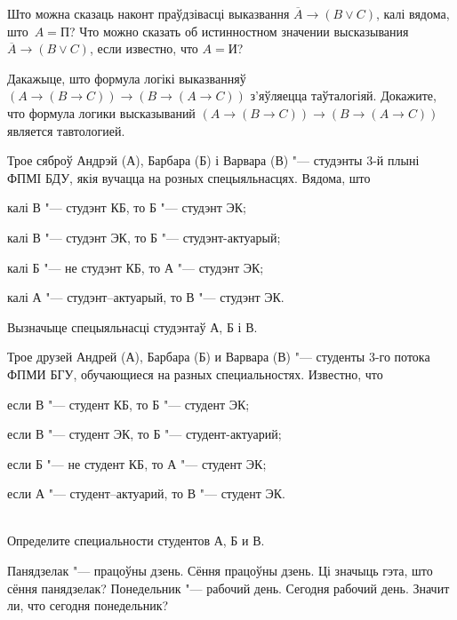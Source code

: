 \begin{problemList}

\problemItemSimple
{Што можна сказаць наконт праўдзівасці выказвання $\overline{A} \to (B \vee C)$, калі вядома, што~$A = \mbox{П}$?}
{Что можно сказать об истинностном значении высказывания $\overline{A} \to (B \vee C)$, если известно, что $A = \mbox{И}$?}

\bigskip

\problemItemSimple
{Дакажыце, што формула логікі выказванняў $(A \to (B \to C)) \to (B \to (A \to C))$ з'яўляецца таўталогіяй.}
{Докажите, что формула логики высказываний $(A \to (B \to C)) \to (B \to (A \to C))$ является тавтологией.}

\bigskip

\problemItemSimple
{Трое сяброў Андрэй (А), Барбара (Б) і Варвара (В) "--- студэнты 3-й плыні ФПМІ БДУ, якія вучацца на розных спецыяльнасцях.
Вядома, што
\begin{belarusianEnumerate}
    \item калі В "--- студэнт КБ, то Б "--- студэнт ЭК;
    \item калі В "--- студэнт ЭК, то Б "--- студэнт-актуарый;
    \item калі Б "--- не студэнт КБ, то А "--- студэнт ЭК;
    \item калі А "--- студэнт–актуарый, то В "--- студэнт ЭК.
\end{belarusianEnumerate}

\vspace{-8pt}
Вызначыце спецыяльнасці студэнтаў А, Б і В.}
{Трое друзей Андрей (А), Барбара (Б) и Варвара (В) "--- студенты 3-го потока ФПМИ БГУ, обучающиеся на разных специальностях.
Известно, что
\begin{russianEnumerate}
    \item если В "--- студент КБ, то Б "--- студент ЭК;
    \item если В "--- студент ЭК, то Б "--- студент-актуарий;
    \item если Б "--- не студент КБ, то А "--- студент ЭК;
    \item если А "--- студент–актуарий, то В "--- студент ЭК.
\end{russianEnumerate}\\
Определите специальности студентов А, Б и В.}

\bigskip

\problemItemSimple
{Панядзелак "--- працоўны дзень. Сёння працоўны дзень. Ці значыць гэта, што сёння панядзелак?}
{Понедельник "--- рабочий день. Сегодня рабочий день. Значит ли, что сегодня понедельник?}


\end{problemList}
